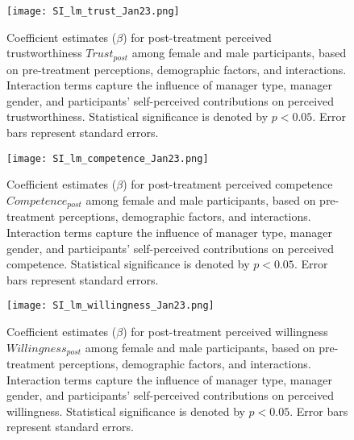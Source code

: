 \begin{figure}[htbp] 
    \centering
    \texttt{[image: SI\_lm\_trust\_Jan23.png]} 
    \caption{
    Coefficient estimates ($\beta$) for post-treatment perceived trustworthiness $Trust_{post}$ among female and male participants, based on pre-treatment perceptions, demographic factors, and interactions. %
    Interaction terms capture the influence of manager type, manager gender, and participants' self-perceived contributions on perceived trustworthiness. Statistical significance is denoted by $p<0.05$. Error bars represent standard errors. 
    } 
    \label{fig: lm_trust} 
\end{figure} 

\begin{figure}[htbp] 
    \centering
    \texttt{[image: SI\_lm\_competence\_Jan23.png]} 
    \caption{
    Coefficient estimates ($\beta$) for post-treatment perceived competence $Competence_{post}$ among female and male participants, based on pre-treatment perceptions, demographic factors, and interactions. %
    Interaction terms capture the influence of manager type, manager gender, and participants' self-perceived contributions on perceived competence. Statistical significance is denoted by $p<0.05$. Error bars represent standard errors. 
    } 
    \label{fig: lm_competence} 
\end{figure} 

\begin{figure}[htbp] 
    \centering
    \texttt{[image: SI\_lm\_willingness\_Jan23.png]} 
    \caption{
    Coefficient estimates ($\beta$) for post-treatment perceived willingness $Willingness_{post}$ among female and male participants, based on pre-treatment perceptions, demographic factors, and interactions. %
    Interaction terms capture the influence of manager type, manager gender, and participants' self-perceived contributions on perceived willingness. Statistical significance is denoted by $p<0.05$. Error bars represent standard errors. 
    } 
    \label{fig: lm_willingness} 
\end{figure} 


